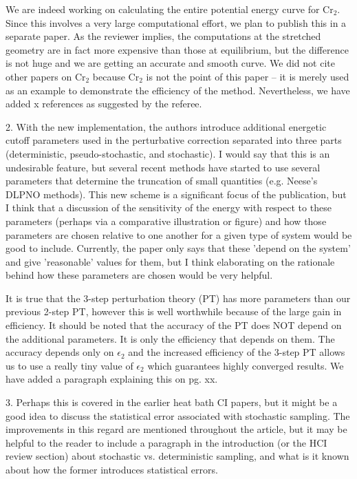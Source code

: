 \documentclass[
preprint,
onecolumn,
 superscriptaddress,
 amsmath,amssymb,
 aps,
]{revtex4-1}
\begin{document}
We are indeed working on calculating the entire potential energy curve for Cr$_2$.  Since this
involves a very large computational effort,
we plan to publish this in a separate paper.  As the reviewer implies, the computations at the
stretched geometry are in fact
more expensive than those at equilibrium, but the difference is not huge and we are getting an
accurate and smooth curve.
We did not cite other papers on Cr$_2$ because Cr$_2$ is not the point of this paper -- it is
merely used as an example to demonstrate
the efficiency of the method.  Nevertheless, we have added x references as suggested by the
referee.

\vskip 5mm {\color{blue}
2. With the new implementation, the authors introduce additional energetic cutoff parameters
used in the perturbative correction separated into three parts (deterministic, pseudo-stochastic,
and stochastic). I would say that this is an undesirable feature, but several recent methods have
started to use several parameters that determine the truncation of small quantities (e.g. Neese's
DLPNO methods). This new scheme is a significant focus of the publication, but I think that
a discussion of the sensitivity of the energy with respect to these parameters (perhaps via a
comparative illustration or figure) and how those parameters are chosen relative to one another
for a given type of system would be good to include. Currently, the paper only says that these
'depend on the system' and give 'reasonable' values for them, but I think elaborating on the
rationale behind how these parameters are chosen would be very helpful.
}\color{black}

It is true that the 3-step perturbation theory (PT) has more parameters than our previous 2-step
PT, however this is well worthwhile
because of the large gain in efficiency.  It should be noted that the accuracy of the PT does
NOT depend on the additional parameters.
It is only the efficiency that depends on them.  The accuracy depends only on $\epsilon_2$
and the increased efficiency of the 3-step PT
allows us to use a really tiny value of $\epsilon_2$ which guarantees highly converged results.
We have added a paragraph explaining
this on pg. xx.

\vskip 5mm {\color{blue}
3. Perhaps this is covered in the earlier heat bath CI papers, but it might be a good idea to
discuss the statistical error associated with stochastic sampling. The improvements in this
regard are mentioned throughout the article, but it may be helpful to the reader to include a
paragraph in the introduction (or the HCI review section) about stochastic vs. deterministic
sampling, and what is it known about how the former introduces statistical errors.
}\color{black}
\end{document}
